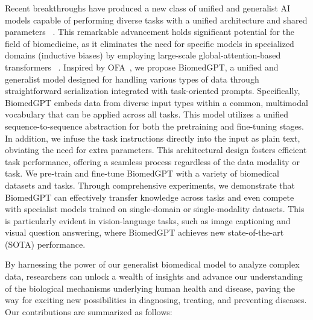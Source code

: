 \documentclass[10pt]{article} \usepackage[preprint]{tmlr}
\begin{document}
Recent breakthroughs have produced a new class of unified and generalist AI models capable of performing diverse tasks with a unified architecture and shared parameters ~\citep{alayrac2022flamingo, li2022uni, wang2022ofa, wang2022git, lu2022unified, chen2022unified, reed2022generalist, gupta2022towards, chen2023towards}. This remarkable advancement holds significant potential for the field of biomedicine, as it eliminates the need for specific models in specialized domains (inductive biases) by employing large-scale global-attention-based transformers ~\citep{vaswani2017attention, yun2019graph, dosovitskiy2020image}. Inspired by OFA~\citep{wang2022ofa}, we propose BiomedGPT, a unified and generalist model designed for handling various types of data through straightforward serialization integrated with task-oriented prompts. Specifically, BiomedGPT embeds data from diverse input types within a common, multimodal vocabulary that can be applied across all tasks. This model utilizes a unified sequence-to-sequence abstraction for both the pretraining and fine-tuning stages. In addition, we infuse the task instructions directly into the input as plain text, obviating the need for extra parameters. This architectural design fosters efficient task performance, offering a seamless process regardless of the data modality or task. We pre-train and fine-tune BiomedGPT with a variety of biomedical datasets and tasks. Through comprehensive experiments, we demonstrate that BiomedGPT can effectively transfer knowledge across tasks and even compete with specialist models trained on single-domain or single-modality datasets. This is particularly evident in vision-language tasks, such as image captioning and visual question answering, where BiomedGPT achieves new state-of-the-art (SOTA) performance. 

By harnessing the power of our generalist biomedical model to analyze complex data, researchers can unlock a wealth of insights and advance our understanding of the biological mechanisms underlying human health and disease, paving the way for exciting new possibilities in diagnosing, treating, and preventing diseases. Our contributions are summarized as follows:
\end{document}

